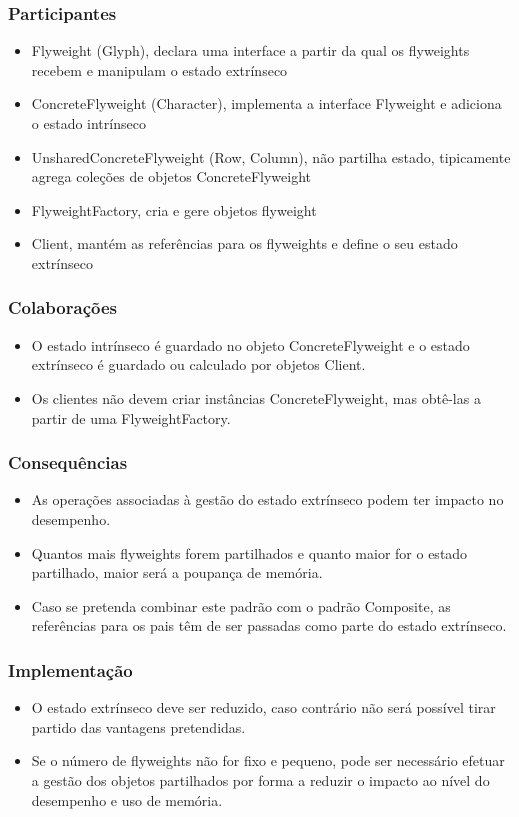 \subsubsection{Participantes}
\begin{itemize}
\item Flyweight (Glyph), declara uma interface a partir da qual os flyweights recebem e manipulam o estado extrínseco
\item ConcreteFlyweight (Character), implementa a interface Flyweight e adiciona o estado intrínseco
\item UnsharedConcreteFlyweight (Row, Column), não partilha estado, tipicamente agrega coleções de objetos ConcreteFlyweight
\item FlyweightFactory, cria e gere objetos flyweight
\item Client, mantém as referências para os flyweights e define o seu estado extrínseco
\end{itemize}

\subsubsection{Colaborações}

\begin{itemize}
\item O estado intrínseco é guardado no objeto ConcreteFlyweight e o estado extrínseco é guardado ou calculado por objetos Client.
\item Os clientes não devem criar instâncias ConcreteFlyweight, mas obtê-las a partir de uma FlyweightFactory.
\end{itemize}

\subsubsection{Consequências}
\begin{itemize}
\item As operações associadas à gestão do estado extrínseco podem ter impacto no desempenho.
\item Quantos mais flyweights forem partilhados e quanto maior for o estado partilhado, maior será a poupança de memória.
\item Caso se pretenda combinar este padrão com o padrão Composite, as referências para os pais têm de ser passadas como parte do estado extrínseco.
\end{itemize}

\subsubsection{Implementação}
\begin{itemize}
\item O estado extrínseco deve ser reduzido, caso contrário não será possível tirar partido das vantagens pretendidas.
\item Se o número de flyweights não for fixo e pequeno, pode ser necessário efetuar a gestão dos objetos partilhados por forma a reduzir o impacto ao nível do desempenho e uso de memória.
\end{itemize}